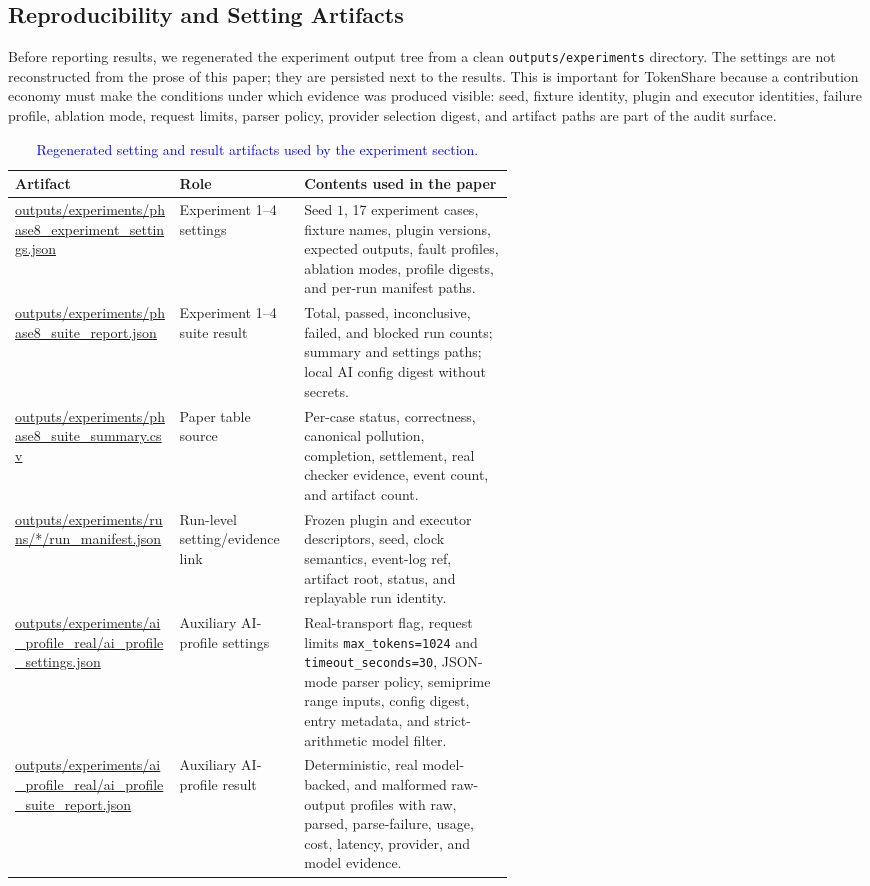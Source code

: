 \documentclass{article}
\theoremstyle{plain}
\begin{document}
\subsection{Reproducibility and Setting Artifacts}
\label{subsec:experiment-settings-artifacts}

{\color{blue}
Before reporting results, we regenerated the experiment output tree from a clean
\texttt{outputs/experiments} directory.  The settings are not reconstructed from
the prose of this paper; they are persisted next to the results.  This is
important for TokenShare because a contribution economy must make the conditions
under which evidence was produced visible: seed, fixture identity, plugin and
executor identities, failure profile, ablation mode, request limits, parser
policy, provider selection digest, and artifact paths are part of the audit
surface.
}

\begin{table}[!htbp]
\centering
\caption{\textcolor{blue}{Regenerated setting and result artifacts used by the
experiment section.}}
\label{tab:experiment-setting-artifacts}
\small
{\color{blue}
\begin{tabularx}{\linewidth}{p{0.33\linewidth}p{0.25\linewidth}X}
\toprule
Artifact & Role & Contents used in the paper \\
\midrule
\url{outputs/experiments/phase8_experiment_settings.json}
& Experiment 1--4 settings
& Seed \(1\), 17 experiment cases, fixture names, plugin versions, expected
outputs, fault profiles, ablation modes, profile digests, and per-run manifest
paths. \\
\url{outputs/experiments/phase8_suite_report.json}
& Experiment 1--4 suite result
& Total, passed, inconclusive, failed, and blocked run counts; summary and
settings paths; local AI config digest without secrets. \\
\url{outputs/experiments/phase8_suite_summary.csv}
& Paper table source
& Per-case status, correctness, canonical pollution, completion, settlement,
real checker evidence, event count, and artifact count. \\
\url{outputs/experiments/runs/*/run_manifest.json}
& Run-level setting/evidence link
& Frozen plugin and executor descriptors, seed, clock semantics, event-log ref,
artifact root, status, and replayable run identity. \\
\url{outputs/experiments/ai_profile_real/ai_profile_settings.json}
& Auxiliary AI-profile settings
& Real-transport flag, request limits \texttt{max\_tokens=1024} and
\texttt{timeout\_seconds=30},
JSON-mode parser policy, semiprime range inputs, config digest, entry metadata,
and strict-arithmetic model filter. \\
\url{outputs/experiments/ai_profile_real/ai_profile_suite_report.json}
& Auxiliary AI-profile result
& Deterministic, real model-backed, and malformed raw-output profiles with raw,
parsed, parse-failure, usage, cost, latency, provider, and model evidence. \\
\bottomrule
\end{tabularx}
}
\end{table}
\end{document}
